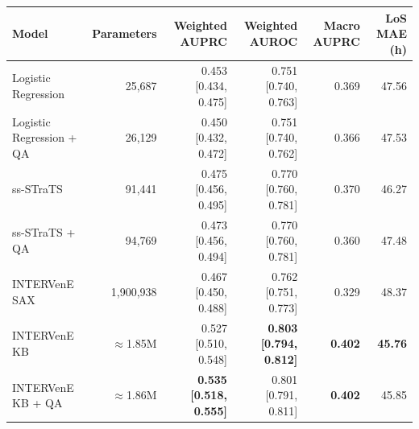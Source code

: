 \begin{tabular}{lrrrrr}
\toprule
Model & Parameters & Weighted AUPRC & Weighted AUROC & Macro AUPRC & LoS MAE (h) \\
\midrule
Logistic Regression & 25,687 & 0.453 [0.434, 0.475] & 0.751 [0.740, 0.763] & 0.369 & 47.56 \\
Logistic Regression + QA & 26,129 & 0.450 [0.432, 0.472] & 0.751 [0.740, 0.762] & 0.366 & 47.53 \\
\midrule
ss-STraTS & 91,441 & 0.475 [0.456, 0.495] & 0.770 [0.760, 0.781] & 0.370 & 46.27 \\
ss-STraTS + QA & 94,769 & 0.473 [0.456, 0.494] & 0.770 [0.760, 0.781] & 0.360 & 47.48 \\
\midrule
INTERVenE SAX & 1,900,938 & 0.467 [0.450, 0.488] & 0.762 [0.751, 0.773] & 0.329 & 48.37 \\
INTERVenE KB & $\approx$1.85M & 0.527 [0.510, 0.548] & \textbf{0.803 [0.794, 0.812]} & \textbf{0.402} & \textbf{45.76} \\
INTERVenE KB + QA & $\approx$1.86M & \textbf{0.535 [0.518, 0.555]} & 0.801 [0.791, 0.811] & \textbf{0.402} & 45.85 \\
\bottomrule
\end{tabular}
